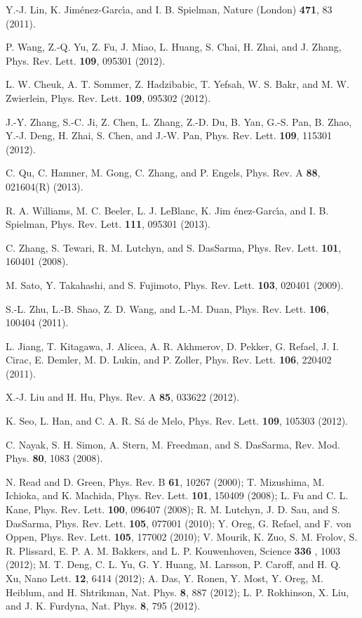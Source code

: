 \documentclass[prl,aps,twocolumn,showpacs, floatfix]{revtex4}
\begin{document}
\begin{thebibliography}{99}
 {Y.-J. Lin, K. Jim\'{e}nez-Garc\'{\i}a, and I. B.
Spielman, Nature (London) \textbf{471}, 83 (2011).}

 {P. Wang, Z.-Q. Yu, Z. Fu, J. Miao, L. Huang, S. Chai,
H. Zhai, and J. Zhang, Phys. Rev. Lett. \textbf{109}, 095301 (2012).}

 {L. W. Cheuk, A. T. Sommer, Z. Hadzibabic, T.
Yefsah, W. S. Bakr, and M. W. Zwierlein, Phys. Rev. Lett. \textbf{109},
095302 (2012).}

 {J.-Y. Zhang, S.-C. Ji, Z. Chen, L. Zhang, Z.-D.
Du, B. Yan, G.-S. Pan, B. Zhao, Y.-J. Deng, H. Zhai, S. Chen, and J.-W. Pan,
Phys. Rev. Lett. \textbf{109}, 115301 (2012).}

 {C. Qu, C. Hamner, M. Gong, C. Zhang, and P. Engels,
Phys. Rev. A \textbf{88}, 021604(R) (2013).}

 {R. A. Williams, M. C. Beeler, L. J. LeBlanc, K. Jim%
\'{e}nez-Garc\'{\i}a, and I. B. Spielman, Phys. Rev. Lett. \textbf{111},
095301 (2013).}

 {C. Zhang, S. Tewari, R. M. Lutchyn, and S. DasSarma,
Phys. Rev. Lett. \textbf{101}, 160401 (2008).}

 {M. Sato, Y. Takahashi, and S. Fujimoto, Phys. Rev.
Lett. \textbf{103}, 020401 (2009).}

 {S.-L. Zhu, L.-B. Shao, Z. D. Wang, and L.-M.
Duan, Phys. Rev. Lett. \textbf{106}, 100404 (2011).}

 {L. Jiang, T. Kitagawa, J. Alicea, A. R. Akhmerov,
D. Pekker, G. Refael, J. I. Cirac, E. Demler, M. D. Lukin, and P. Zoller,
Phys. Rev. Lett. \textbf{106}, 220402 (2011).}

 {X.-J. Liu and H. Hu, Phys. Rev. A \textbf{85},
033622 (2012).}

 {K. Seo, L. Han, and C. A. R. S\'{a} de Melo, Phys.
Rev. Lett. \textbf{109}, 105303 (2012).}

 {C. Nayak, S. H. Simon, A. Stern, M. Freedman, and S.
DasSarma, Rev. Mod. Phys. \textbf{80}, 1083 (2008).}

 {N. Read and D. Green, Phys. Rev. B \textbf{61}, 10267
(2000); T. Mizushima, M. Ichioka, and K. Machida, Phys. Rev. Lett. \textbf{%
101}, 150409 (2008); L. Fu and C. L. Kane, Phys. Rev. Lett. \textbf{100},
096407 (2008); R. M. Lutchyn, J. D. Sau, and S. DasSarma, Phys. Rev. Lett.
\textbf{105}, 077001 (2010); Y. Oreg, G. Refael, and F. von Oppen, Phys.
Rev. Lett. \textbf{105}, 177002 (2010); V. Mourik, K. Zuo, S. M. Frolov, S.
R. Plissard, E. P. A. M. Bakkers, and L. P. Kouwenhoven, Science \textbf{336}%
, 1003 (2012); M. T. Deng, C. L. Yu, G. Y. Huang, M. Larsson, P. Caroff, and
H. Q. Xu, Nano Lett. \textbf{12}, 6414 (2012); A. Das, Y. Ronen, Y. Most, Y.
Oreg, M. Heiblum, and H. Shtrikman, Nat. Phys. \textbf{8}, 887 (2012); L. P.
Rokhinson, X. Liu, and J. K. Furdyna, Nat. Phys. \textbf{8}, 795 (2012). }


\end{thebibliography}
\end{document}
